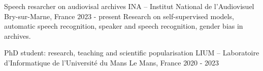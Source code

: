 
\begin{cventries}
	\cventry
		{Speech resarcher on audiovisal archives}
		{INA -- Institut National de l'Audiovisuel}
		{Bry-sur-Marne, France}
		{2023 - present}
		{Research on self-supervised models, automatic speech recognition, speaker and speech recognition, gender bias in archives.}

	\cventry
		{PhD student: research, teaching and scientific popularisation}
		{LIUM -- Laboratoire d'Informatique de l'Université du Mans}
		{Le Mans, France}
		{2020 - 2023}
		{}

\end{cventries}
